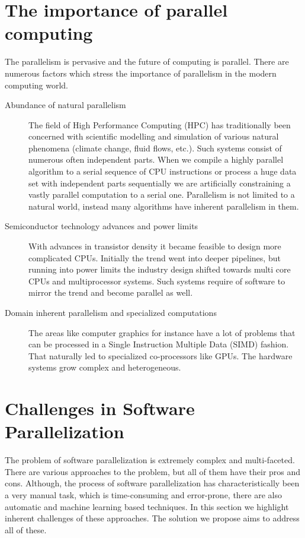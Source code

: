 \section{The importance of parallel computing}
\label{background_importance}
\quad The parallelism is pervasive and the future of computing is parallel. There are numerous factors which stress the importance of parallelism in the modern computing world.
\begin{description}
\item[Abundance of natural parallelism] The field of High Performance Computing (HPC) has traditionally been concerned with scientific modelling and simulation of various natural phenomena (climate change, fluid flows, etc.). Such systems consist of numerous often independent parts. When we compile a highly parallel algorithm to a serial sequence of CPU instructions or process a huge data set with independent parts sequentially we are artificially constraining a vastly parallel computation to a serial one. Parallelism is not limited to a natural world, instead many algorithms have inherent parallelism in them.
\item[Semiconductor technology advances and power limits] With advances in transistor density it became feasible to design more complicated CPUs. Initially the trend went into deeper pipelines, but running into power limits the industry design shifted towards multi core CPUs and multiprocessor systems. Such systems require of software to mirror the trend and become parallel as well.
\item[Domain inherent parallelism and specialized computations] The areas like computer graphics for instance have a lot of problems that can be processed in a Single Instruction Multiple Data (SIMD) fashion. That naturally led to specialized co-processors like GPUs. The hardware systems grow complex and heterogeneous.
\end{description}

\section{Challenges in Software Parallelization}
\label{background_challenges}
\quad The problem of software parallelization is extremely complex and multi-faceted. There are various approaches to the problem, but all of them have their pros and cons. Although, the process of software parallelization has characteristically been a very manual task, which is time-consuming and error-prone, there are also automatic and machine learning based techniques. In this section we highlight inherent challenges of these approaches. The solution we propose aims to address all of these. 

